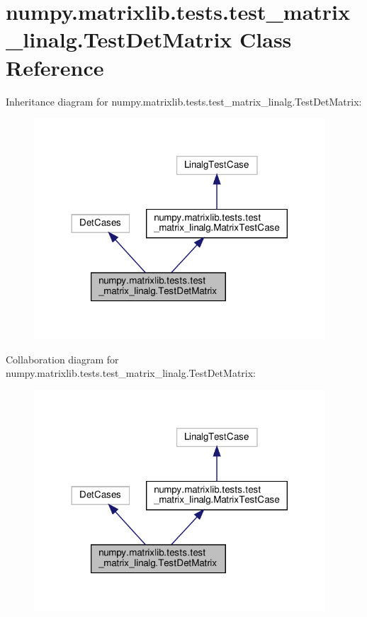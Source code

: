 \hypertarget{classnumpy_1_1matrixlib_1_1tests_1_1test__matrix__linalg_1_1TestDetMatrix}{}\section{numpy.\+matrixlib.\+tests.\+test\+\_\+matrix\+\_\+linalg.\+Test\+Det\+Matrix Class Reference}
\label{classnumpy_1_1matrixlib_1_1tests_1_1test__matrix__linalg_1_1TestDetMatrix}


Inheritance diagram for numpy.\+matrixlib.\+tests.\+test\+\_\+matrix\+\_\+linalg.\+Test\+Det\+Matrix\+:
\nopagebreak
\begin{figure}[H]
\begin{center}
\leavevmode
\includegraphics[width=308pt]{classnumpy_1_1matrixlib_1_1tests_1_1test__matrix__linalg_1_1TestDetMatrix__inherit__graph}
\end{center}
\end{figure}


Collaboration diagram for numpy.\+matrixlib.\+tests.\+test\+\_\+matrix\+\_\+linalg.\+Test\+Det\+Matrix\+:
\nopagebreak
\begin{figure}[H]
\begin{center}
\leavevmode
\includegraphics[width=308pt]{classnumpy_1_1matrixlib_1_1tests_1_1test__matrix__linalg_1_1TestDetMatrix__coll__graph}
\end{center}
\end{figure}
